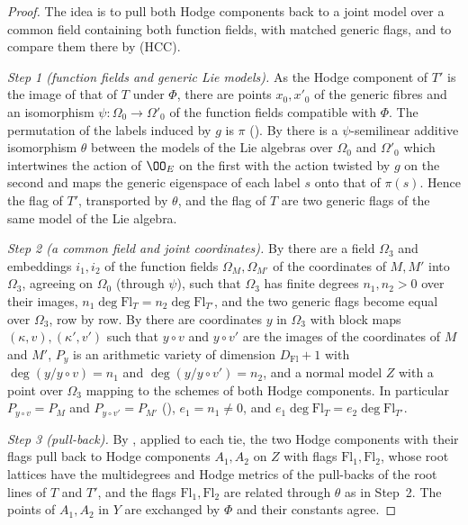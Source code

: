 \begin{proof}
The idea is to pull both Hodge components back to a joint model over a common field containing both function fields, with
matched generic flags, and to compare them there by (HCC).

\emph{Step 1 (function fields and generic Lie models).} As the Hodge component of $T'$ is the image of that of $T$ under
$\Phi$, there are points $x_0,x'_0$ of the generic fibres and an isomorphism $\psi\colon\Omega_0\to\Omega'_0$ of the function
fields compatible with $\Phi$. The permutation of the labels induced by $g$ is $\pi$
(). By  there is a
$\psi$-semilinear additive isomorphism $\theta$ between the models of the Lie algebras over $\Omega_0$ and $\Omega'_0$ which
intertwines the action of $\OO_E$ on the first with the action twisted by $g$ on the second and maps the generic eigenspace
of each label $s$ onto that of $\pi(s)$. Hence the flag of $T'$, transported by $\theta$, and the flag of $T$ are two generic
flags of the same model of the Lie algebra.

\emph{Step 2 (a common field and joint coordinates).} By  there
are a field $\Omega_3$ and embeddings $i_1,i_2$ of the function fields $\Omega_M,\Omega_{M'}$ of the coordinates of $M,M'$ into
$\Omega_3$, agreeing on $\Omega_0$ (through $\psi$), such that $\Omega_3$ has finite degrees $n_1,n_2>0$ over their images,
$n_1\deg\mathrm{Fl}_T=n_2\deg\mathrm{Fl}_{T'}$, and the two generic flags become equal over $\Omega_3$, row by row. By
 there are coordinates $y$ in $\Omega_3$ with block maps
$(\kappa,v),(\kappa',v')$ such that $y\circ v$ and $y\circ v'$ are the images of the coordinates of $M$ and $M'$, $P_y$ is an
arithmetic variety of dimension $D_{\mathrm{Fl}}+1$ with $\deg(y/y\circ v)=n_1$ and $\deg(y/y\circ v')=n_2$, and a normal model
$Z$ with a point over $\Omega_3$ mapping to the schemes of both Hodge components. In particular $P_{y\circ v}=P_M$ and
$P_{y\circ v'}=P_{M'}$ (), $e_1=n_1\ne0$, and
$e_1\deg\mathrm{Fl}_T=e_2\deg\mathrm{Fl}_{T'}$.

\emph{Step 3 (pull-back).} By , applied to each tie, the two
Hodge components with their flags pull back to Hodge components $A_1,A_2$ on $Z$ with flags $\mathrm{Fl}_1,\mathrm{Fl}_2$, whose
root lattices have the multidegrees and Hodge metrics of the pull-backs of the root lines of $T$ and $T'$, and the flags
$\mathrm{Fl}_1,\mathrm{Fl}_2$ are related through $\theta$ as in Step~2. The points of $A_1,A_2$ in $Y$ are exchanged by $\Phi$ and
their constants agree.


\end{proof}
